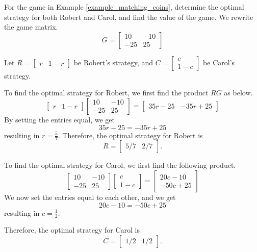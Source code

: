 \begin{example}
    For the game in Example \ref{example_matching_coins}, determine the optimal strategy for both Robert and Carol, and find the value of the game. We rewrite the game matrix.
    \[ G = \begin{bmatrix} 10 & -10 \\ -25 & 25 \end{bmatrix} \]
\end{example}
\begin{solution}
    Let \( R = \begin{bmatrix} r & 1 - r \end{bmatrix} \) be Robert's strategy, and \( C = \begin{bmatrix} c \\ 1 - c \end{bmatrix} \) be Carol's strategy.

    To find the optimal strategy for Robert, we first find the product \( RG \) as below.
    \[ \begin{bmatrix} r & 1 - r \end{bmatrix} \begin{bmatrix} 10 & -10 \\ -25 & 25 \end{bmatrix} = \begin{bmatrix} 35r - 25 & -35r + 25 \end{bmatrix} \]
    By setting the entries equal, we get \[ 35r - 25 = -35r + 25 \] resulting in \( r = \frac{5}{7} \). Therefore, the optimal strategy for Robert is \[ R=  \begin{bmatrix} 5/7 & 2/7 \end{bmatrix} .\]

    To find the optimal strategy for Carol, we first find the following product.
    \[ \begin{bmatrix} 10 & -10 \\ -25 & 25 \end{bmatrix} \begin{bmatrix} c \\ 1 - c \end{bmatrix} = \begin{bmatrix} 20c - 10 \\ -50c +25 \end{bmatrix} \]
    We now set the entries equal to each other, and we get \[ 20c - 10 = -50c + 25 \] resulting in \( c = \frac{1}{2} \).

    Therefore, the optimal strategy for Carol is \[ C = \begin{bmatrix} 1/2 & 1/2 \end{bmatrix}. \]


\end{solution}
